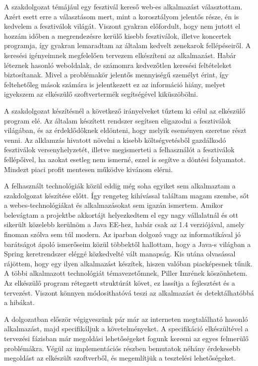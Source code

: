 

A szakdolgozat témájául egy fesztivál kereső web-es alkalmazást választottam. Azért esett erre a választásom mert, mint a korosztályom jelentős része, én is kedvelem a fesztiválok világát. Viszont gyakran előfordult, hogy nem jutott el hozzám időben a megrendezésre kerülő kisebb fesztiválok, illetve koncertek programja, így gyakran lemaradtam az általam kedvelt zenekarok fellépéseiről. A keresési igényeimnek megfelelően tervezem elkészíteni az alkalmazást. Habár léteznek hasonló weboldalak, de számomra kedvezőtlen keresési feltételeket biztosítanak. Mivel a problémakör jelentős mennyiségű személyt érint, így feltehetőleg mások számára is jelentkezett ez az információ hiány, melyet igyekszem az elkészülő szoftvertermék segítségével kiküszöbölni. 

A szakdolgozat készítésnél a következő irányelveket tűztem ki célul az elkészülő program elé.
Az általam készített rendszer segítsen eligazodni a fesztiválok világában, és az érdeklődőknek eldönteni, hogy melyik eseményen szeretne részt venni. Az alklamzás hivatott növelni a kisebb költségvetésből gazdálkodó fesztiválok versenyhelyzetét, illetve megismerteti a felhasználót a fesztiválok fellépőivel, ha azokat esetleg nem ismerné, ezzel is segítve a döntési folyamatot. Mindezt piaci profit mentesen működve kivánom elérni.

A felhasznált technológiák közül eddig még soha egyiket sem alkalmaztam a szakdolgozat készítése előtt. Így rengeteg kihívással találtam magam szembe, sőt a webes-technológiákat és alkalmazásokat sem igazán ismertem. Amikor belevágtam a projektbe akkortájt helyezkedtem el egy nagy vállalatnál és ott sikerült közelebb kerülnöm a Java EE-hez, habár csak az 1.4 verziójával, amely finoman szólva sem túl modern. Az iparban dolgozó vagy az informatikával jó barátságot ápoló ismerőseim közül többektől hallottam, hogy a Java-s világban a Spring keretrendszer eléggé közkedvelté vált manapság. Kis utána olvasással rájöttem, hogy egy ilyen alkalmazást készítek, hiszen valóban piacképesnek tűnik. A többi alkalmazott technológiát témavezetőmnek, Piller Imrének köszönhetem.  Az elkészülő program rétegzett struktúrát követ, ez lassítja a fejlesztést és a tervezést. Viszont könnyen módosithatóvá teszi az alkalmazást és detektálhatóbbá a hibákat.

A dolgozatban először végigveszünk pár már az interneten megtalálható hasonló alkalmazást, majd specifikáljuk a követelményeket. A specifikáció elkészültével a tervezési fázisban már megoldási lehetőségeket fogunk keresni az egyes felmerülő problémákra. Végül az implementációs részben bemutatok néhány érdekesebb megoldást az elkészült szoftverből, és megemlítjük a tesztelési lehetőségeket.

